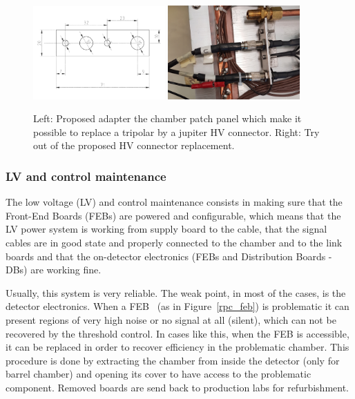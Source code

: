 \begin{figure}[!htbp]
\begin{center}
\includegraphics[width=0.45\textwidth,keepaspectratio]{figures_and_tables/rpc/endcap_hv_pp.pdf}\hspace*{1.cm}
\includegraphics[width=0.45\textwidth,keepaspectratio]{figures_and_tables/rpc/endcap_hv_pp_tryout.jpg}\hspace*{1.cm}
\end{center}\vspace*{-.5cm}
\caption{Left: Proposed adapter the chamber patch panel which make it possible to replace a tripolar by a jupiter HV connector. Right: Try out of the proposed HV connector replacement.}
\label{jupiterized}
\end{figure}

\subsubsection{LV and control maintenance}

The low voltage (LV) and control maintenance consists in making sure that the Front-End Boards (FEBs) are powered and configurable, which means that the LV power system is working from supply board to the cable, that the signal cables are in good state and properly connected to the chamber and to the link boards and that the on-detector electronics (FEBs and Distribution Boards - DBs) are working fine.

Usually, this system is very reliable. The weak point, in most of the cases, is the detector electronics. When a FEB~\cite{rpc_feb} (as in Figure~\ref{rpc_feb}) is problematic it can present regions of very high noise or no signal at all (silent), which can not be recovered by the threshold control. In cases like this, when the FEB is accessible, it can be replaced in order to recover efficiency in the problematic chamber. This procedure is done by extracting the chamber from inside the detector (only for barrel chamber) and opening its cover to have access to the problematic component. Removed boards are send back to production labs for refurbishment.

